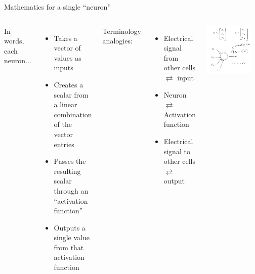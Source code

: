 \documentclass[mathserif, aspectratio=169]{beamer}
\begin{document}
\begin{frame}{Mathematics for a single ``neuron''}   
    \begin{columns}
    		In words, each neuron...
    		\begin{itemize}
    			\item Takes a vector of values as inputs
    			\item Creates a scalar from a linear combination of the vector entries
    			\item Passes the resulting scalar through an ``activation function''
    			\item Outputs a single value from that activation function
    		\end{itemize}

    		Terminology analogies:
    		\begin{itemize}
    			\item Electrical signal from other cells $\rightleftarrows$ input
    			\item Neuron $\rightleftarrows$ Activation function
    			\item Electrical signal to other cells $\rightleftarrows$ output
    		\end{itemize}
    	\pause
    	\includegraphics[width=0.85\textwidth]{neuron_math.pdf}
	    	
    \end{columns}
\end{frame}
\end{document}

